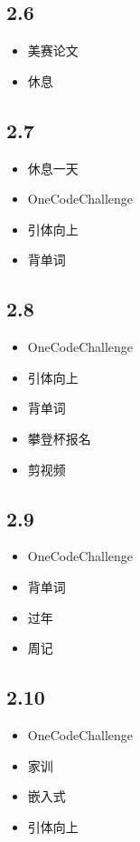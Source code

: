 \documentclass[UTF8]{ctexart}
\begin{document}
\subsection*{2.6}
\begin{itemize}
    \item 美赛论文
    \item 休息
\end{itemize}

\subsection*{2.7}
\begin{itemize}
    \item 休息一天
    \item OneCodeChallenge
    \item 引体向上
    \item 背单词
\end{itemize}

\subsection*{2.8}
\begin{itemize}
    \item OneCodeChallenge
    \item 引体向上
    \item 背单词
    \item 攀登杯报名
    \item 剪视频
\end{itemize}

\subsection*{2.9}
\begin{itemize}
    \item OneCodeChallenge
    \item 背单词
    \item 过年
    \item 周记
\end{itemize}

\subsection*{2.10}
\begin{itemize}
    \item OneCodeChallenge
    \item 家训
    \item 嵌入式
    \item 引体向上
\end{itemize}
\end{document}
